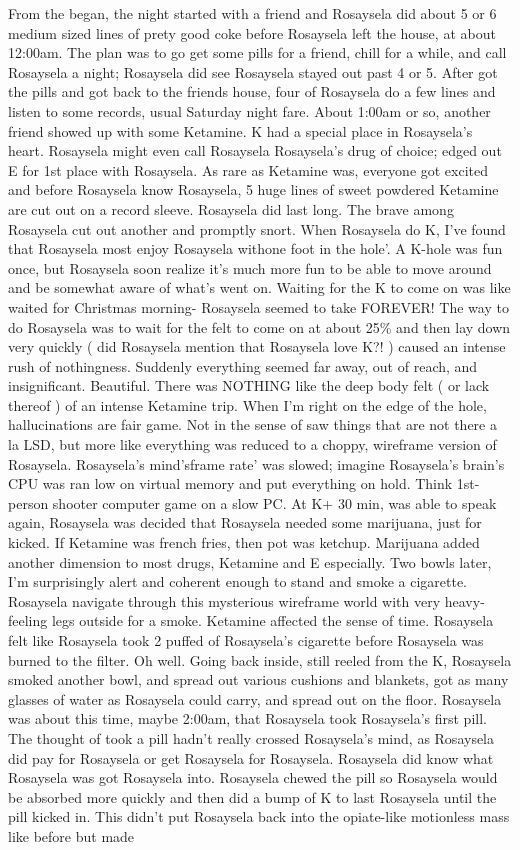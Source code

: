 \documentclass[12pt]{book}
\begin{document}
From the began, the night started with a friend and Rosaysela did about 5 or 6 medium sized lines of prety good coke before Rosaysela left the house, at about 12:00am. The plan was to go get some pills for a friend, chill for a while, and call Rosaysela a night; Rosaysela did see Rosaysela stayed out past 4 or 5. After got the pills and got back to the friends house, four of Rosaysela do a few lines and listen to some records, usual Saturday night fare. About 1:00am or so, another friend showed up with some Ketamine. K had a special place in Rosaysela's heart. Rosaysela might even call Rosaysela Rosaysela's drug of choice; edged out E for 1st place with Rosaysela. As rare as Ketamine was, everyone got excited and before Rosaysela know Rosaysela, 5 huge lines of sweet powdered Ketamine are cut out on a record sleeve. Rosaysela did last long. The brave among Rosaysela cut out another and promptly snort. When Rosaysela do K, I've found that Rosaysela most enjoy Rosaysela withone foot in the hole'. A K-hole was fun once, but Rosaysela soon realize it's much more fun to be able to move around and be somewhat aware of what's went on. Waiting for the K to come on was like waited for Christmas morning- Rosaysela seemed to take FOREVER! The way to do Rosaysela was to wait for the felt to come on at about 25\% and then lay down very quickly ( did Rosaysela mention that Rosaysela love K?! ) caused an intense rush of nothingness. Suddenly everything seemed far away, out of reach, and insignificant. Beautiful. There was NOTHING like the deep body felt ( or lack thereof ) of an intense Ketamine trip. When I'm right on the edge of the hole, hallucinations are fair game. Not in the sense of saw things that are not there a la LSD, but more like everything was reduced to a choppy, wireframe version of Rosaysela. Rosaysela's mind'sframe rate' was slowed; imagine Rosaysela's brain's CPU was ran low on virtual memory and put everything on hold. Think 1st-person shooter computer game on a slow PC. At K+ 30 min, was able to speak again, Rosaysela was decided that Rosaysela needed some marijuana, just for kicked. If Ketamine was french fries, then pot was ketchup. Marijuana added another dimension to most drugs, Ketamine and E especially. Two bowls later, I'm surprisingly alert and coherent enough to stand and smoke a cigarette. Rosaysela navigate through this mysterious wireframe world with very heavy-feeling legs outside for a smoke. Ketamine affected the sense of time. Rosaysela felt like Rosaysela took 2 puffed of Rosaysela's cigarette before Rosaysela was burned to the filter. Oh well. Going back inside, still reeled from the K, Rosaysela smoked another bowl, and spread out various cushions and blankets, got as many glasses of water as Rosaysela could carry, and spread out on the floor. Rosaysela was about this time, maybe 2:00am, that Rosaysela took Rosaysela's first pill. The thought of took a pill hadn't really crossed Rosaysela's mind, as Rosaysela did pay for Rosaysela or get Rosaysela for Rosaysela. Rosaysela did know what Rosaysela was got Rosaysela into. Rosaysela chewed the pill so Rosaysela would be absorbed more quickly and then did a bump of K to last Rosaysela until the pill kicked in. This didn't put Rosaysela back into the opiate-like motionless mass like before but made 
\end{document}
